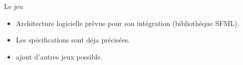 \begin{frame}{Le jeu}
  \begin{itemize}
    \item Architecture logicielle prévue pour son intégration (bibliothèque SFML).
    \item Les spécifications sont déja précisées.
      \item ajout d'autres jeux possible.
    \end{itemize}
\end{frame}
